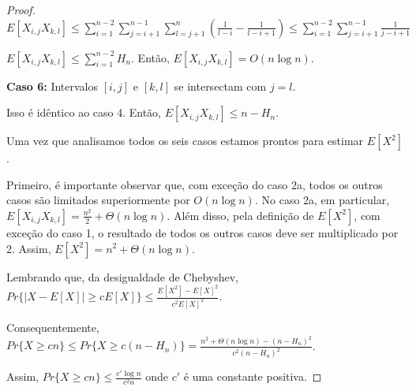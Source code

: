 \documentclass[12pt]{article}
\begin{document}
\begin{proof}
$E[X_{i,j} X_{k,l}] \leq \sum\limits_{i=1}^{n-2}
\sum\limits_{j=i+1}^{n-1} \sum\limits_{l=j+1}^{n} \left( \frac{1}{l-i} - \frac{1}{l-i+1} \right)
\leq \sum\limits_{i=1}^{n-2}
\sum\limits_{j=i+1}^{n-1} \frac{1}{j-i+1}
$

$E[X_{i,j} X_{k,l}] \leq \sum\limits_{i=1}^{n-2} H_{n}$. Então, $E[X_{i,j} X_{k,l}] = O(n \log n)$.


{\bf Caso 6:} Intervalos $[i, j]$ e $[k, l]$ se intersectam com $j = l$.

Isso é idêntico ao caso 4. Então, $E[X_{i,j} X_{k,l}] \leq n - H_{n}$.


\vspace{0.5cm}

Uma vez que analisamos todos os seis casos estamos prontos para estimar
$E[X^2]$.

Primeiro, é importante observar que, com exceção do caso 2a, todos os outros
casos são limitados superiormente por $O(n \log n)$. No caso 2a, em particular,
$E[X_{i,j} X_{k,l}] = \frac{n^2}{2} + \Theta(n \log n)$. Além disso, pela definição de $E[X^2]$,
com exceção do caso 1, o resultado de todos os outros casos deve ser multiplicado por 2.
Assim, $E[X^2] = n^2+ \Theta(n \log n)$.

Lembrando que, da desigualdade de Chebyshev, $Pr\{ |X - E[X]| \geq c E[X] \} \leq \frac{E[X^2] - E[X]^2}{c^2 E[X]^2}$.

Consequentemente, $Pr\{ X \geq c n \} \leq Pr\{ X \geq c (n - H_{n}) \} = \frac{n^2 + \Theta(n \log n) - (n - H_{n})^2}{c^2 (n - H_{n})^2}$.

Assim, $Pr\{ X \geq c n \} \leq \frac{c' \log n}{c^2 n}$ onde $c'$ é uma constante positiva.


\end{proof}









%
\end{document}
